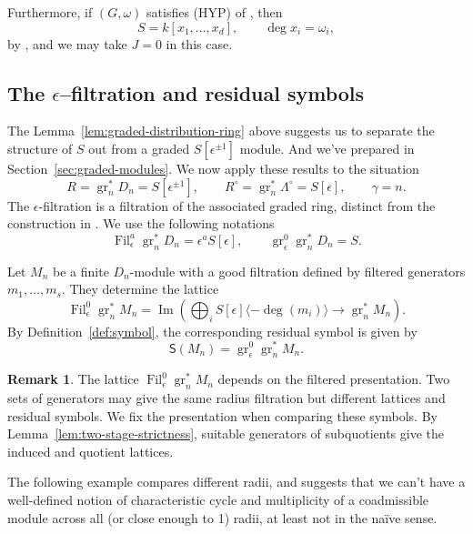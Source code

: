 \documentclass[11pt]{article}
\theoremstyle{definition}
\newtheorem{remark}[theorem]{Remark}
\newcommand{\gr}{\operatorname{gr}}
\newcommand{\Fil}{\operatorname{Fil}}
\newcommand{\im}{\operatorname{Im}}
\begin{document}
Furthermore, if $(G,\omega)$ satisfies (HYP) of
\cite[\S4]{ST03}, then
\[
 S=k[x_1,\ldots,x_d],\qquad\deg x_i=\omega_i,
\]
by \cite[Lemma~4.4 and Theorem~4.5]{ST03}, and we may take $J=0$ in this case.

\subsection{The \texorpdfstring{$\epsilon$}{epsilon}--filtration and residual symbols}
\label{sec:distribution-symbols}
The Lemma~\ref{lem:graded-distribution-ring} above suggests us to separate the structure of $S$ out from a graded $S[\epsilon^{\pm1}]$ module. 
And we've prepared in Section~\ref{sec:graded-modules}.
We now apply these results to the situation
\[
 R=\gr_n^*D_n=S[\epsilon^{\pm1}],\qquad
 R^\circ=\gr_n^*\Lambda^\circ=S[\epsilon],\qquad \gamma=n.
\]
The $\epsilon$-filtration is a filtration of the associated graded
ring, distinct from the construction in
\cite[Sections~3.1--3.2]{ArdakovWadsley2013}. We use the following notations
\[
 \Fil_\epsilon^a\gr_n^*D_n=\epsilon^aS[\epsilon],
 \qquad \gr_\epsilon^0\gr_n^*D_n=S.
\]

Let $M_n$ be a finite $D_n$-module with a good filtration defined
by filtered generators $m_1,\ldots,m_s$. They determine the lattice
\[
 \Fil_\epsilon^0\gr_n^*M_n
 =\im\left(
 \bigoplus_iS[\epsilon]\langle-\deg(m_i)\rangle
 \longrightarrow\gr_n^*M_n
 \right).
\]
By Definition~\ref{def:symbol}, the corresponding residual symbol is given by
\[
 \mathsf S(M_n)=\gr_\epsilon^0\gr_n^*M_n.
\]

\begin{remark}
The lattice $\Fil_\epsilon^0\gr_n^*M_n$ depends on the filtered
presentation. Two sets of generators may give the same radius
filtration but different lattices and residual symbols.
We fix the presentation when comparing these symbols.
By Lemma~\ref{lem:two-stage-strictness}, suitable generators of
subquotients give the induced and quotient lattices.
\end{remark}

The following example compares different radii, and suggests that we can't have
a well-defined notion of characteristic cycle and multiplicity of a coadmissible module
across all (or close enough to 1) radii, at least not in the na\"ive sense. 
\end{document}

